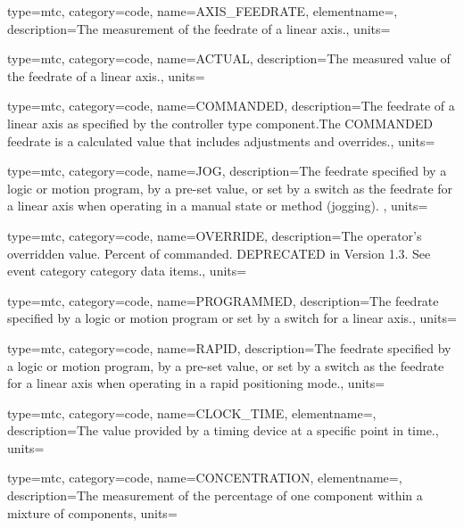 {
  type=mtc,
  category=code,
  name={AXIS\_FEEDRATE},
  elementname=,
  description={The measurement of the feedrate of a linear axis.},
  units=
}

{
  type=mtc,
  category=code,
  name={ACTUAL},
  description={The measured value of the feedrate of a linear axis.},
  units=
}

{
  type=mtc,
  category=code,
  name={COMMANDED},
  description={The feedrate of a linear axis as specified by the \gls{controller} type component.The COMMANDED feedrate is a calculated value that includes adjustments and overrides.},
  units=
}

{
  type=mtc,
  category=code,
  name={JOG},
  description={The feedrate specified by a logic or motion program, by a pre-set value, or set by a switch as the feedrate for a linear axis when operating in a manual state or method (jogging).  },
  units=
}

{
  type=mtc,
  category=code,
  name={OVERRIDE},
  description={The operator’s overridden value. Percent of commanded.  DEPRECATED in Version 1.3.   See \gls{event category} category data items.},
  units=
}

{
  type=mtc,
  category=code,
  name={PROGRAMMED},
  description={The feedrate specified by a logic or motion program or set by a switch for a linear axis.},
  units=
}

{
  type=mtc,
  category=code,
  name={RAPID},
  description={The feedrate specified by a logic or motion program, by a pre-set value, or set by a switch as the feedrate for a linear axis when operating in a rapid positioning mode.},
  units=
}

{
  type=mtc,
  category=code,
  name={CLOCK\_TIME},
  elementname=,
  description={The value provided by a timing device at a specific point in time.},
  units=
}

{
  type=mtc,
  category=code,
  name={CONCENTRATION},
  elementname=,
  description={The measurement of the percentage of one component within a mixture of components},
  units=
}

